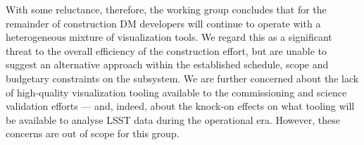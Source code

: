 With some reluctance, therefore, the working group concludes that for the remainder of construction DM developers will continue to operate with a heterogeneous mixture of visualization tools.
We regard this as a significant threat to the overall efficiency of the construction effort, but are unable to suggest an alternative approach within the established schedule, scope and budgetary constraints on the subsystem.
We are further concerned about the lack of high-quality visualization tooling available to the commissioning and science validation efforts --- and, indeed, about the knock-on effects on what tooling will be available to analyse LSST data during the operational era.
However, these concerns are out of scope for this group.
